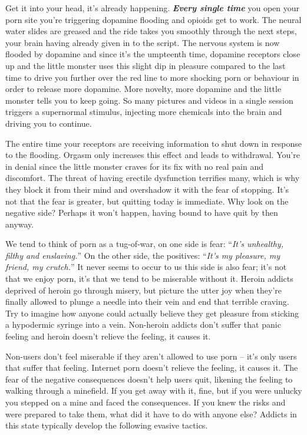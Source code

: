 \documentclass[
]{book}
\begin{document}
Get it into your head, it's already happening. \textbf{\emph{Every single time}} you open your porn site you're triggering dopamine flooding and opioids get to work. The neural water slides are greased and the ride takes you smoothly through the next steps, your brain having already given in to the script. The nervous system is now flooded by dopamine and since it's the umpteenth time, dopamine receptors close up and the little monster uses this slight dip in pleasure compared to the last time to drive you further over the red line to more shocking porn or behaviour in order to release more dopamine. More novelty, more dopamine and the little monster tells you to keep going. So many pictures and videos in a single session triggers a supernormal stimulus, injecting more chemicals into the brain and driving you to continue.

The entire time your receptors are receiving information to shut down in response to the flooding. Orgasm only increases this effect and leads to withdrawal. You're in denial since the little monster craves for its fix with no real pain and discomfort. The threat of having erectile dysfunction terrifies many, which is why they block it from their mind and overshadow it with the fear of stopping. It's not that the fear is greater, but quitting today is immediate. Why look on the negative side? Perhaps it won't happen, having bound to have quit by then anyway.

We tend to think of porn as a tug-of-war, on one side is fear: ``\emph{It's unhealthy, filthy and enslaving.}'' On the other side, the positives: ``\emph{It's my pleasure, my friend, my crutch.}'' It never seems to occur to us this side is also fear; it's not that we enjoy porn, it's that we tend to be miserable without it. Heroin addicts deprived of heroin go through misery, but picture the utter joy when they're finally allowed to plunge a needle into their vein and end that terrible craving. Try to imagine how anyone could actually believe they get pleasure from sticking a hypodermic syringe into a vein. Non-heroin addicts don't suffer that panic feeling and heroin doesn't relieve the feeling, it causes it.

Non-users don't feel miserable if they aren't allowed to use porn -- it's only users that suffer that feeling. Internet porn doesn't relieve the feeling, it causes it. The fear of the negative consequences doesn't help users quit, likening the feeling to walking through a minefield. If you get away with it, fine, but if you were unlucky you stepped on a mine and faced the consequences. If you knew the risks and were prepared to take them, what did it have to do with anyone else? Addicts in this state typically develop the following evasive tactics.
\end{document}

